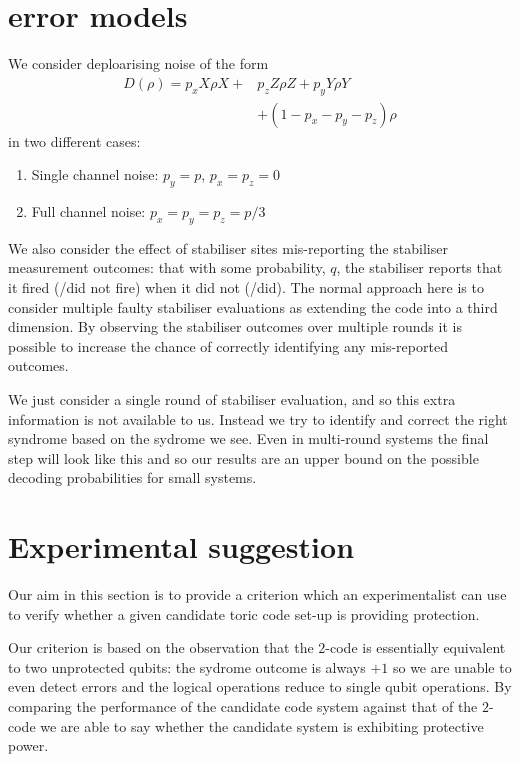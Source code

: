 \section{error models}

We consider deploarising noise of the form
\begin{equation} \label{noise_eq}
  \begin{split}
  D(\rho) = p_x X\rho X + & p_z Z\rho Z + p_y Y\rho Y \\
  & + (1- p_x - p_y - p_z)\rho
  \end{split}
\end{equation}
in two different cases:
\begin{enumerate}
  \item Single channel noise: $p_y = p$, $p_x = p_z = 0$
  \item Full channel noise: $p_x = p_y = p_z = p/3$
\end{enumerate}

We also consider the effect of stabiliser sites mis-reporting the stabiliser measurement outcomes: that with some probability, $q$, the stabiliser reports that it fired (/did not fire) when it did not (/did). The normal approach here is to consider multiple faulty stabiliser evaluations as extending the code into a third dimension. By observing the stabiliser outcomes over multiple rounds it is possible to increase the chance of correctly identifying any mis-reported outcomes.

We just consider a single round of stabiliser evaluation, and so this extra information is not available to us. Instead we try to identify and correct the right syndrome based on the sydrome we see. Even in multi-round systems the final step will look like this and so our results are an upper bound on the possible decoding probabilities for small systems.

\section{Experimental suggestion}

Our aim in this section is to provide a criterion which an experimentalist can use to verify whether a given candidate toric code set-up is providing protection.

Our criterion is based on the observation that the $2$-code is essentially equivalent to two unprotected qubits: the sydrome outcome is always $+1$ so we are unable to even detect errors and the logical operations reduce to single qubit operations. By comparing the performance of the candidate code system against that of the $2$-code we are able to say whether the candidate system is exhibiting protective power. 

